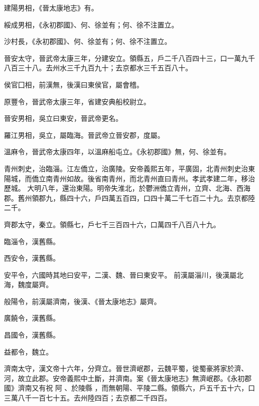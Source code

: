\begin{pinyinscope}
 建陽男相，《晉太康地志》有。



 綏成男相，《永初郡國》、何、徐並有；何、徐不注置立。



 沙村長，《永初郡國》、何、徐並有；何、徐不注置立。



 晉安太守，晉武帝太康三年，分建安立。領縣五，戶二千八百四十三，口一萬九千八百三十八。去州水三千九百九十；去京都水三千五百八十。



 侯官囗相，前漢無，後漢曰東侯官，屬會稽。



 原豐令，晉武帝太康三年，省建安典船校尉立。



 晉安男相，吳立曰東安，晉武帝更名。



 羅江男相，吳立，屬臨海。晉武帝立晉安郡，度屬。



 溫麻令，晉武帝太康四年，以溫麻船屯立。《永初郡國》無，何、徐並有。



 青州刺史，治臨淄。江左僑立，治廣陵。安帝義熙五年，平廣固，北青州刺史治東陽城，而僑立南青州如故。後省南青州，而北青州直曰青州。孝武孝建二年，移治歷城。
 大明八年，還治東陽。明帝失淮北，於鬱洲僑立青州，立齊、北海、西海郡。舊州領郡九，縣四十六，戶四萬五百四，口四十萬二千七百二十九。去京都陸二千。



 齊郡太守，秦立。領縣七，戶七千三百四十六，口萬四千八百八十九。



 臨淄令，漢舊縣。



 西安令，漢舊縣。



 安平令，六國時其地曰安平，二漢、魏、晉曰東安平。
 前漢屬淄川，後漢屬北海，魏度屬齊。



 般陽令，前漢屬濟南，後漢、《晉太康地志》屬齊。



 廣饒令，漢舊縣。



 昌國令，漢舊縣。



 益都令，魏立。


濟南太守，漢文帝十六年，分齊立。晉世濟岷郡，云魏平蜀，徙蜀豪將家於濟、河，故立此郡。安帝義熙中土斷，并濟南。案《晉太康地志》無濟岷郡。《永初郡國》濟南又有祝
 阿
 、於陵縣
 ，而無朝陽、平陵二縣。領縣六，戶五千五十六，口三萬八千一百七十五。去州陸四百；去京都二千四百。




\end{pinyinscope}

